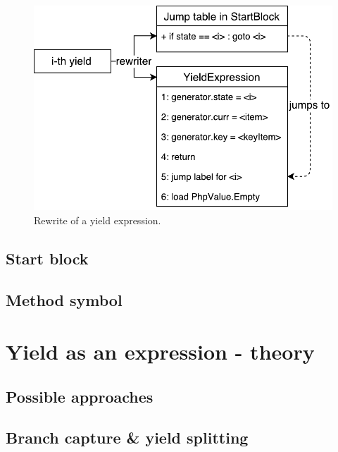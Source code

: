 \begin{figure}[h]
	\centering	
	\includegraphics[scale=0.75]{../img/5_1_rewriter}	
	\caption{Rewrite of a yield expression.}
	\label{fig5.1:Rewriter}
\end{figure}


\subsection{Start block}

\subsection{Method symbol}

\section{Yield as an expression - theory}

\subsection{Possible approaches}

\subsection{Branch capture \& yield splitting}

